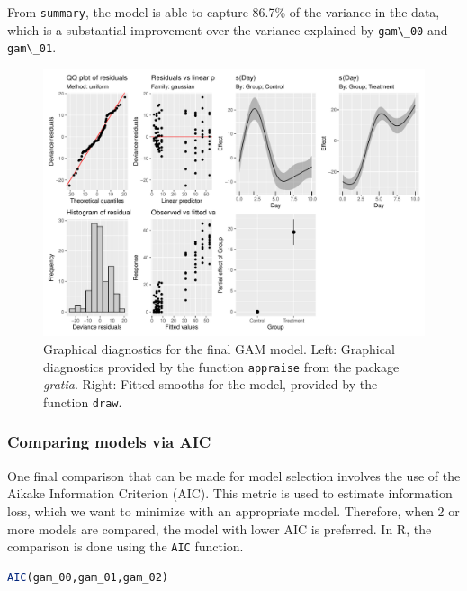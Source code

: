 \documentclass[
]{article}
\newcommand{\passthrough}[1]{#1}
\begin{document}
From \passthrough{\lstinline!summary!}, the model is able to capture 86.7\% of the variance in the data, which is a substantial improvement over the variance explained by \passthrough{\lstinline!gam\_00!} and \passthrough{\lstinline!gam\_01!}.



\begin{figure}

{\centering \includegraphics[width=0.75\linewidth]{Appendix_A_files/figure-latex/final-GAM-diag-1} 

}

\caption{Graphical diagnostics for the final GAM model. Left: Graphical diagnostics provided by the function \passthrough{\lstinline!appraise!} from the package \emph{gratia}. Right: Fitted smooths for the model, provided by the function \passthrough{\lstinline!draw!}.}\label{fig:final-GAM-diag}
\end{figure}

\hypertarget{comparing-models-via-aic}{%
\subsubsection{Comparing models via AIC}\label{comparing-models-via-aic}}

One final comparison that can be made for model selection involves the use of the Aikake Information Criterion (AIC). This metric is used to estimate information loss, which we want to minimize with an appropriate model. Therefore, when 2 or more models are compared, the model with lower AIC is preferred. In R, the comparison is done using the \passthrough{\lstinline!AIC!} function.

\begin{lstlisting}[language=R]
AIC(gam_00,gam_01,gam_02)
\end{lstlisting}
\end{document}
